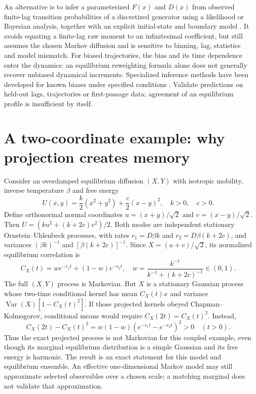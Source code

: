 \documentclass[11pt,a4paper]{article}
\theoremstyle{remark}\newtheorem*{remark}{Physical interpretation}
\begin{document}
An alternative is to infer a parameterized $F(x)$ and $D(x)$ from observed finite-lag transition probabilities of a discretized generator using a likelihood or Bayesian analysis, together with an explicit initial-state and boundary model \cite{hummer2005}. It avoids equating a finite-lag raw moment to an infinitesimal coefficient, but still assumes the chosen Markov diffusion and is sensitive to binning, lag, statistics and model mismatch. For biased trajectories, the bias and its time dependence enter the dynamics: an equilibrium reweighting formula alone does not generally recover unbiased dynamical increments. Specialized inference methods have been developed for known biases under specified conditions \cite{comer,sicard}. Validate predictions on held-out lags, trajectories or first-passage data; agreement of an equilibrium profile is insufficient by itself.

\section{A two-coordinate example: why projection creates memory}
Consider an overdamped equilibrium diffusion $(X,Y)$ with isotropic mobility, inverse temperature $\beta$ and free energy
\begin{equation}
U(x,y)=\frac{k}{2}(x^2+y^2)+\frac{c}{2}(x-y)^2,\quad k>0,\quad c>0.
\end{equation}
Define orthonormal normal coordinates $u=(x+y)/\sqrt2$ and $v=(x-y)/\sqrt2$. Then $U=(ku^2+(k+2c)v^2)/2$. Both modes are independent stationary Ornstein--Uhlenbeck processes, with rates $r_1=D\beta k$ and $r_2=D\beta(k+2c)$, and variances $(\beta k)^{-1}$ and $[\beta(k+2c)]^{-1}$. Since $X=(u+v)/\sqrt2$, its normalized equilibrium correlation is
\begin{equation}
C_X(t)=w e^{-r_1t}+(1-w)e^{-r_2t},\quad
w=\frac{k^{-1}}{k^{-1}+(k+2c)^{-1}}\in(0,1).
\end{equation}
The full $(X,Y)$ process is Markovian. But $X$ is a stationary Gaussian process whose two-time conditional kernel has mean $C_X(t)x$ and variance $\operatorname{Var}(X)[1-C_X(t)^2]$. If those projected kernels obeyed Chapman--Kolmogorov, conditional means would require $C_X(2t)=C_X(t)^2$. Instead,
\begin{equation}
C_X(2t)-C_X(t)^2=w(1-w)(e^{-r_1t}-e^{-r_2t})^2>0\quad(t>0).
\end{equation}
Thus the exact projected process is not Markovian for this coupled example, even though its marginal equilibrium distribution is a simple Gaussian and its free energy is harmonic. The result is an exact statement for this model and equilibrium ensemble. An effective one-dimensional Markov model may still approximate selected observables over a chosen scale; a matching marginal does not validate that approximation.
\end{document}
